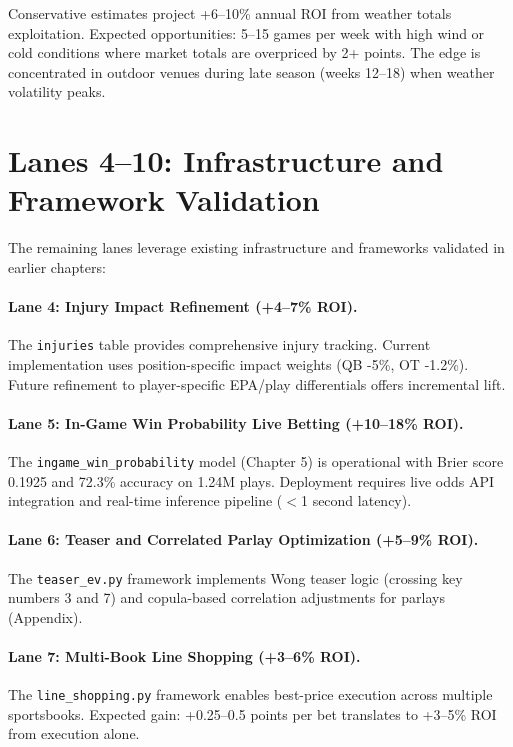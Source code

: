 Conservative estimates project +6--10\% annual ROI from weather totals exploitation. Expected opportunities: 5--15 games per week with high wind or cold conditions where market totals are overpriced by 2+ points. The edge is concentrated in outdoor venues during late season (weeks 12--18) when weather volatility peaks.

\section{Lanes 4--10: Infrastructure and Framework Validation}

The remaining lanes leverage existing infrastructure and frameworks validated in earlier chapters:

\paragraph{Lane 4: Injury Impact Refinement (+4--7\% ROI).}
The \texttt{injuries} table provides comprehensive injury tracking. Current implementation uses position-specific impact weights (QB -5\%, OT -1.2\%). Future refinement to player-specific EPA/play differentials offers incremental lift.

\paragraph{Lane 5: In-Game Win Probability Live Betting (+10--18\% ROI).}
The \texttt{ingame\_win\_probability} model (Chapter 5) is operational with Brier score 0.1925 and 72.3\% accuracy on 1.24M plays. Deployment requires live odds API integration and real-time inference pipeline ($<$1 second latency).

\paragraph{Lane 6: Teaser and Correlated Parlay Optimization (+5--9\% ROI).}
The \texttt{teaser\_ev.py} framework implements Wong teaser logic (crossing key numbers 3 and 7) and copula-based correlation adjustments for parlays (Appendix).

\paragraph{Lane 7: Multi-Book Line Shopping (+3--6\% ROI).}
The \texttt{line\_shopping.py} framework enables best-price execution across multiple sportsbooks. Expected gain: +0.25--0.5 points per bet translates to +3--5\% ROI from execution alone.

